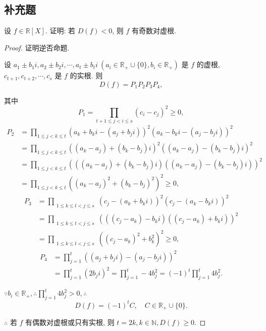\documentclass[color=black,device=normal,lang=cn,mode=geye]{elegantnote}
\begin{document}
\subsection{补充题}
\begin{exercisec}%
    设 $f\in\mathbb{R}[X]$. 证明: 若 $D(f)<0$, 则 $f$ 有奇数对虚根.
\end{exercisec}
\begin{proof}
    证明逆否命题.

    设 $a_1\pm b_1i,a_2\pm b_2i,\cdots,a_t\pm b_ti\ (a_i\in\mathbb{R}_+\cup\{0\},b_i\in\mathbb{R}_+)$ 是 $f$ 的虚根, $c_{t+1},c_{t+2},\cdots,c_s$ 是 $f$ 的实根. 则
    \[D(f)=P_1P_2P_3P_4,\]

    其中
    \[P_1=\prod\limits_{t+1\leq j<i\leq s}(c_i-c_j)^2\geq0,\]
    \begin{align*}
        P_2 & =\prod\limits_{1\leq j<k\leq t}(a_k+b_ki-(a_j+b_ji))^2(a_k-b_ki-(a_j-b_ji))^2 \\
        & =\prod\limits_{1\leq j<k\leq t}((a_k-a_j)+(b_k-b_j)i)^2((a_k-a_j)-(b_k-b_j)i)^2 \\
        & =\prod\limits_{1\leq j<k\leq t}(((a_k-a_j)+(b_k-b_j)i)((a_k-a_j)-(b_k-b_j)i))^2 \\
        & =\prod\limits_{1\leq j<k\leq t}((a_k-a_j)^2+(b_k-b_j)^2)^2\geq0,
    \end{align*}
    \begin{align*}
        P_3 & =\prod\limits_{\substack{1\leq k\leq t<j\leq s}}(c_j-(a_k+b_ki))^2(c_j-(a_k-b_ki))^2 \\
        & =\prod\limits_{\substack{1\leq k\leq t<j\leq s}}(((c_j-a_k)-b_ki)((c_j-a_k)+b_ki))^2 \\
        & =\prod\limits_{\substack{1\leq k\leq t<j\leq s}}((c_j-a_k)^2+b_k^2)^2\geq0,
    \end{align*}
    \begin{align*}
        P_4 & =\prod\limits_{j=1}^t((a_j+b_ji)-(a_j-b_ji))^2 \\
        & =\prod\limits_{j=1}^t(2b_ji)^2=\prod\limits_{j=1}^t-4b_j^2=(-1)^t\prod\limits_{j=1}^t4b_j^2.
    \end{align*}

    $\because b_i\in\mathbb{R}_+,\therefore\prod\limits_{j=1}^t4b_j^2>0,\therefore$
    \[D(f)=(-1)^tC,\quad C\in\mathbb{R}_+\cup\{0\}.\]

    $\therefore$ 若 $f$ 有偶数对虚根或只有实根, 则 $t=2k,k\in\mathbb{N},D(f)\geq0$.
\end{proof}
\end{document}
